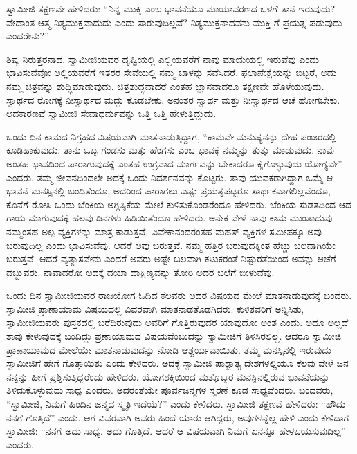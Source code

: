  ಸ್ವಾಮೀಜಿ ತಕ್ಷಣವೇ ಹೇಳಿದರು: “ನಿನ್ನ ಮುಕ್ತಿ ಎಂಬ ಭಾವನೆಯೂ ಮಾಯಾವರಣದ ಒಳಗೆ ತಾನೆ ಇರುವುದು? ವೇದಾಂತ ಆತ್ಮ ನಿತ್ಯಮುಕ್ತವಾದುದು ಎಂದು ಸಾರುವುದಿಲ್ಲವೆ? ನಿತ್ಯಮುಕ್ತನಾದವನು ಮುಕ್ತಿ ಗೆ ಪ್ರಯತ್ನ ಪಡುವುದು ಎಂದರೇನು?” 

 ಶಿಷ್ಯ ನಿರುತ್ತರನಾದ. ಸ್ವಾಮೀಜಿಯವರ ದೃಷ್ಟಿಯಲ್ಲಿ ಎಲ್ಲಿಯವರೆಗೆ ನಾವು ಮಾಯೆಯಲ್ಲಿ ಇರುವೆವು ಎಂದು ಭಾವಿಸುವೆವೋ ಅಲ್ಲಿಯವರೆಗೆ ಇತರರ ಸೇವೆಯಲ್ಲಿ ನಮ್ಮ ಬಾಳನ್ನು ಸವೆಸಿದರೆ, ಫಲಾಪೇಕ್ಷೆಯನ್ನು ಬಿಟ್ಟರೆ, ಅದು ನಮ್ಮ ಚಿತ್ರವನ್ನು ಶುದ್ಧಿಮಾಡುವುದು. ಚಿತ್ತಶುದ್ಧವಾದರೆ ಎಂತಹ ಜ್ಞಾನವಾದರೂ ತಕ್ಷಣವೇ ಹೊಳೆಯುವುದು. ಸ್ವಾರ್ಥದ ರೋಗಕ್ಕೆ ನಿಃಸ್ವಾರ್ಥದ ಮದ್ದು ಕೊಡಬೇಕು. ಅನಂತರ ಸ್ವಾರ್ಥ ಮತ್ತು ನಿಃಸ್ವಾರ್ಥದ ಆಚೆ ಹೋಗಬೇಕು. ಆದಕಾರಣವೆ ಸ್ವಾಮೀಜಿ ಸೇವಾಧರ್ಮವನ್ನು ಒತ್ತಿ ಒತ್ತಿ ಹೇಳುತ್ತಿದ್ದುದು. 

 ಒಂದು ದಿನ ಕಾಮದ ನಿಗ್ರಹದ ವಿಷಯವಾಗಿ ಮಾತನಾಡುತ್ತಿದ್ದಾಗ, “ಕಾಮವೇ ಮನುಷ್ಯನನ್ನು ದೇಹ ಪಂಜರದಲ್ಲಿ ಕೂಡಿಹಾಕುವುದು. ತಾನು ಒಬ್ಬ ಗಂಡಸು ಮತ್ತು ಹೆಂಗಸು ಎಂಬ ಭಾವಕ್ಕೆ ನಮ್ಮನ್ನು ತುತ್ತು ಮಾಡುವುದು. ನಾವು ಅಂತಹ ಭಾವದಿಂದ ಪಾರಾಗುವುದಕ್ಕೆ ಎಂತಹ ಉಗ್ರವಾದ ಮಾರ್ಗವನ್ನು ಬೇಕಾದರೂ ಕೈಗೊಳ್ಳುವುದು ಯೋಗ್ಯವೇ” ಎಂದರು. ತಮ್ಮ ಜೀವನದಿಂದಲೇ ಅದಕ್ಕೆ ಒಂದು ನಿದರ್ಶನವನ್ನು ಕೊಟ್ಟರು. ತಾವು ಯುವಕರಾಗಿದ್ದಾಗ ಒಮ್ಮೆ ಆ ಭಾವನೆ ಮನಸ್ಸಿನಲ್ಲಿ ಬಂದಿತೆಂದೂ, ಅದರಿಂದ ಪಾರಾಗಲು ಎಷ್ಟು ಪ್ರಯತ್ನಪಟ್ಟರೂ ಸಾರ್ಥಕವಾಗಲಿಲ್ಲವೆಂದೂ, ಕೊನೆಗೆ ರೋಸಿ ಒಂದು ಬೆಂಕಿಯ ಅಗ್ಗಿಷ್ಠಿಕೆಯ ಮೇಲೆ ಕುಳಿತುಕೊಂಡರೆಂದೂ ಹೇಳಿದರು. ಬೆಂಕಿಯ ಸುಡತದಿಂದ ಆದ ಗಾಯ ಮಾಗುವುದಕ್ಕೆ ಹಲವು ದಿನಗಳು ಹಿಡಿಯಿತೆಂದೂ ಹೇಳಿದರು. ಅನೇಕ ವೇಳೆ ನಾವು ಕಾಮ ಮುಂತಾದುವು ನಮ್ಮಂತಹ ಅಲ್ಪ ವ್ಯಕ್ತಿಗಳನ್ನು ಮಾತ್ರ ಕಾಡುತ್ತವೆ, ವಿವೇಕಾನಂದರಂತಹ ಮಹತ್ ವ್ಯಕ್ತಿಗಳ ಸಮೀಪಕ್ಕೂ ಅವು ಬರುವುದಿಲ್ಲ ಎಂದು ಭಾವಿಸುವೆವು. ಆದರೆ ಅವು ಬರುತ್ತವೆ. ನಮ್ಮ ಹತ್ತಿರ ಬರುವುದಕ್ಕಿಂತ ಹೆಚ್ಚು ಬಲವಾಗಿಯೇ ಬರುತ್ತವೆ. ಆದರೆ ವ್ಯತ್ಯಾಸವೇನು ಎಂದರೆ ಅವರು ಅಷ್ಟೇ ಬಲವಾಗಿ ಕಟುಕರಂತೆ ನಿಷ್ಟುರತೆಯಿಂದ ಅವನ್ನು ಆಚೆಗೆ ದಬ್ಬುವರು. ನಾವಾದರೋ ಅದಕ್ಕೆ ದಯಾ ದಾಕ್ಷಿಣ್ಯವನ್ನು ತೋರಿ ಅದರ ಬಲೆಗೆ ಬೀಳುವೆವು. 

 ಒಂದು ದಿನ ಸ್ವಾಮೀಜಿಯವರ ರಾಜಯೋಗ ಓದಿದ ಕೆಲವರು ಅದರ ವಿಷಯದ ಮೇಲೆ ಮಾತನಾಡುವುದಕ್ಕೆ ಬಂದರು. ಸ್ವಾಮೀಜಿ ಪ್ರಾಣಾಯಾಮ ವಿಷಯದಲ್ಲಿ ವಿವರವಾಗಿ ಮಾತನಾಡತೊಡಗಿದರು. ಕುಳಿತವರಿಗೆ ಅನ್ನಿಸಿತು, ಸ್ವಾಮೀಜಿಯವರು ಪುಸ್ತಕದಲ್ಲಿ ಬರೆದಿರುವುದು ಅವರಿಗೆ ಗೊತ್ತಿರುವುದರ ಯಾವುದೋ ಅಂಶ ಎಂದು. ಅದೂ ಅಲ್ಲದೆ ತಾವು ಕೇಳುವುದಕ್ಕೆ ಬಂದಿದ್ದು ಪ್ರಣಾಯಾಮದ ವಿಷಯವೆಂಬುದನ್ನು ಸ್ವಾಮೀಜಿಗೆ ತಿಳಿಸಿರಲಿಲ್ಲ. ಆದರೂ ಸ್ವಾಮೀಜಿ ಪ್ರಾಣಾಯಾಮದ ಮೇಲೆಯೇ ಮಾತನಾಡುವುದನ್ನು ನೋಡಿ ಆಶ್ಚರ್ಯವಾಯಿತು. ತಮ್ಮ ಮನಸ್ಸಿನಲ್ಲಿ ಇರುವುದು ಸ್ವಾಮೀಜಿಗೆ ಹೇಗೆ ಗೊತ್ತಾಯಿತು ಎಂದು ಕೇಳಿದರು. ಅದಕ್ಕೆ ಸ್ವಾಮೀಜಿ ಪಾಶ್ಚಾತ್ಯ ದೇಶಗಳಲ್ಲಿಯೂ ಕೆಲವು ವೇಳೆ ಜನ ನನ್ನನ್ನು ಹೀಗೆ ಪ್ರಶ್ನಿಸುತ್ತಿದ್ದರೆಂದು ಹೇಳಿದರು. ಯೋಗಶಕ್ತಿಯಿಂದ ಮತ್ತೊಬ್ಬರ ಮನಸ್ಸಿನಲ್ಲಿರುವ ಭಾವನೆಯನ್ನು ತಿಳಿದುಕೊಳ್ಳುವುದು ಸಾಧ್ಯ ಎಂದರು. ಅದರಂತೆಯೇ ಪೂರ್ವಜನ್ಮಗಳ ಸ್ಮರಣೆ ಕೂಡ ಸಾಧ್ಯವೆಂದರು. ಬಂದವರು, “ಸ್ವಾಮೀಜಿ, ನಿಮಗೆ ಹಿಂದಿನ ಜನ್ಮದ ಸ್ಮೃತಿ ಇದೆಯೆ?” ಎಂದು ಕೇಳಿದರು. ಸ್ವಾಮೀಜಿ ತಕ್ಷಣವೆ ಹೇಳಿದರು: “ಹೌದು ನನಗೆ ಗೊತ್ತಿದೆ” ಎಂದು. ಆಗ ವಿವರವಾಗಿ ಅವರು ಹಿಂದೆ ಯಾರು ಆಗಿದ್ದರು, ಅವುಗಳನ್ನೆಲ್ಲ ಹೇಳಿ ಎಂದು ಕೇಳಿದಾಗ ಸ್ವಾಮೀಜಿ: “ನನಗೆ ಅದು ಸಾಧ್ಯ. ಅದು ಗೊತ್ತಿದೆ. ಆದರೆ ಆ ವಿಷಯವಾಗಿ ನಿಮಗೆ ಏನನ್ನೂ ಹೇಳಬಯಸುವುದಿಲ್ಲ” ಎಂದರು. 

